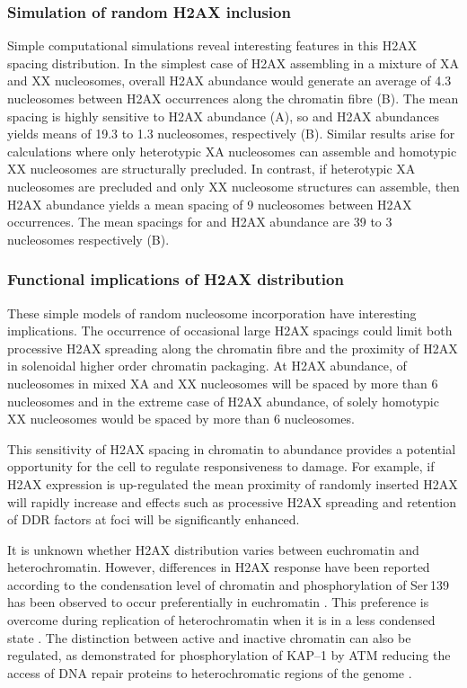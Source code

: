 \subsubsection{Simulation of random H2AX inclusion}
Simple computational simulations reveal interesting features in this
H2AX spacing distribution. In the simplest case of H2AX assembling in
a mixture of XA and XX nucleosomes,  overall H2AX abundance
would generate an average of 4.3 nucleosomes between H2AX occurrences
along the chromatin fibre (B). The
mean spacing is highly sensitive to H2AX abundance
(A), so  and 
H2AX abundances yields means of 19.3 to 1.3 nucleosomes, respectively
(B). Similar results arise for
calculations where only heterotypic XA nucleosomes can assemble and
homotypic XX nucleosomes are structurally precluded. In contrast, if
heterotypic XA nucleosomes are precluded and only XX nucleosome
structures can assemble, then  H2AX abundance yields a mean
spacing of 9 nucleosomes between H2AX occurrences. The mean spacings
for  and  H2AX abundance are 39 to 3 nucleosomes
respectively (B).

\subsubsection{Functional implications of H2AX distribution}
These simple models of random nucleosome incorporation have
interesting implications. The occurrence of occasional large H2AX
spacings could limit both processive \textgamma H2AX spreading along
the chromatin fibre and the proximity of H2AX in solenoidal higher
order chromatin packaging. At  H2AX abundance,  of
nucleosomes in mixed XA and XX nucleosomes will be spaced by more than
6 nucleosomes and in the extreme case of  H2AX abundance,
 of solely homotypic XX nucleosomes would be spaced by more
than 6 nucleosomes.

This sensitivity of H2AX spacing in chromatin to abundance provides a
potential opportunity for the cell to regulate responsiveness to
damage. For example, if H2AX expression is up-regulated the mean
proximity of randomly inserted H2AX will rapidly increase and effects
such as processive \textgamma H2AX spreading and retention of DDR
factors at foci will be significantly enhanced.

It is unknown whether H2AX distribution varies between euchromatin and
heterochromatin. However, differences in H2AX response have been
reported according to the condensation level of chromatin and
phosphorylation of Ser\,139 has been observed to occur preferentially
in euchromatin \citep{IGC+07}.
This preference is overcome during replication of heterochromatin when
it is in a less condensed state \citep{IGC+07}. The distinction
between active and inactive chromatin can also be regulated, as
demonstrated for phosphorylation of KAP--1 by ATM reducing the access
of DNA repair proteins to heterochromatic regions of the genome
\citep{AAG+08}.

